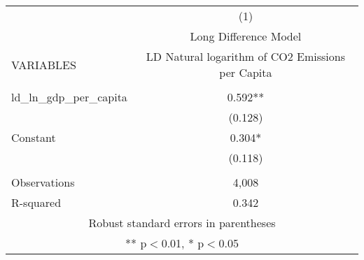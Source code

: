 \begin{tabular}{lc} \hline
 & (1) \\
 & Long Difference Model \\
VARIABLES & LD Natural logarithm of CO2 Emissions per Capita \\ \hline
 &  \\
ld\_ln\_gdp\_per\_capita & 0.592** \\
 & (0.128) \\
Constant & 0.304* \\
 & (0.118) \\
 &  \\
Observations & 4,008 \\
 R-squared & 0.342 \\ \hline
\multicolumn{2}{c}{ Robust standard errors in parentheses} \\
\multicolumn{2}{c}{ ** p$<$0.01, * p$<$0.05} \\
\end{tabular}
